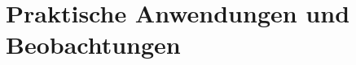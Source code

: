 \documentclass{mythesis}
\begin{document}
%







\section{Praktische Anwendungen und Beobachtungen}





\end{document}

